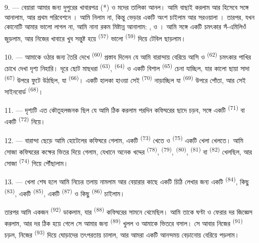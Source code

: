 9. --- বেয়ারা আমার জন্য দুপুরের খাবারপত্র (*) ও মদের তালিকা আনল। আমি বাছাই
করলাম আর  হিসেবে  সঙ্গে 
আনালাম, আর প্রথম পরিবেশনে । আমি
 নিলাম না, কিন্তু ভেড়ার  একটি অংশ চাইলাম আর
 সরওয়ালা । তারপর, যখন  কোনোটি
আমার ভালো লাগল না, আমি নানা রকম মিষ্টান্ন আনালাম: ,
 ও । আমি সঙ্গে একটি চমৎকার সঁ-এমিলিওঁ
 জুড়লাম, আর নিজের খাবারে খুব সন্তুষ্ট হয়ে 
\textsuperscript{(57)} ভালো  \textsuperscript{(59)} দিয়ে টেবিল
ছাড়লাম।

10. --- আমাকে ওঠার জন্য তৈরি দেখে  \textsuperscript{(60)}
প্রস্তাব দিলেন যে আমি বারান্দায় বেরিয়ে আসি ও 
\textsuperscript{(62)} চমৎকার পাখির চোখে দেখা দৃশ্য নিহারি। দূরে ছোট মাছধরা
 \textsuperscript{(63)}, 
\textsuperscript{(64)} ও একটি বিশাল  \textsuperscript{(65)}
চেনা যাচ্ছিল, যার কালো ছায়া সাদা  \textsuperscript{(67)} উপরে
ফুটে উঠছিল, যা  \textsuperscript{(66)}। একটি হালকা হাওয়া সেই
 \textsuperscript{(70)} নাড়াচ্ছিল যা 
\textsuperscript{(69)} উপরে পোঁতা, আর সেই সাইনবোর্ড 
\textsuperscript{(68)}।

\VUsaut{3.0mm}
\VUsaut{3.0mm}

11. --- দৃশ্যটি এত কৌতূহলজনক ছিল যে আমি ঠিক করলাম পরদিন কফিঘরের ছাদে চড়ব,
সঙ্গে একটি  \textsuperscript{(71)} বা একটি 
\textsuperscript{(72)} নিয়ে।

12. --- বারান্দা ছেড়ে আমি হোটেলের কফিঘরে গেলাম, একটি 
\textsuperscript{(73)} খেতে ও  \textsuperscript{(75)} একটি
খেলা খেলতে। আমি সোজা কফিঘরের কক্ষের ভিতর দিয়ে গেলাম, যেখানে অনেক খদ্দের
 \textsuperscript{(78)},  \textsuperscript{(79)},
 \textsuperscript{(80)}, 
\textsuperscript{(81)} বা  \textsuperscript{(82)} খেলছিল, আর সোজা
 \textsuperscript{(74)} গিয়ে পৌঁছালাম।

13. --- খেলা শেষ হলে আমি নিচের তলায় নামলাম আর বেয়ারার কাছে একটি চিঠি লেখার
জন্য একটি  \textsuperscript{(84)}, কিছু 
\textsuperscript{(83)}, একটি  \textsuperscript{(85)}, একটি
 \textsuperscript{(87)} ও কিছু  \textsuperscript{(86)}
চাইলাম।

তারপর আমি একজন  \textsuperscript{(92)} ডাকলাম, যার
 \textsuperscript{(88)} কফিঘরের সামনে থেমেছিল। আমি তাকে ঘণ্টা ও
ফেরার দর জিজ্ঞেস করলাম, আর দর ঠিক হয়ে গেলে সে আমার জন্য 
\textsuperscript{(89)} খুলল ও আমাকে ভিতরে বসাল। সে আবার নিজের 
\textsuperscript{(91)} চড়ল, নিজের  \textsuperscript{(93)} দিয়ে
ঘোড়াদের তৎপরতায় চালাল, আর আমরা একটি আনন্দময় বেড়ানোয় বেরিয়ে পড়লাম।
\VUsaut{6.0mm}
\VUfilet{22mm}
